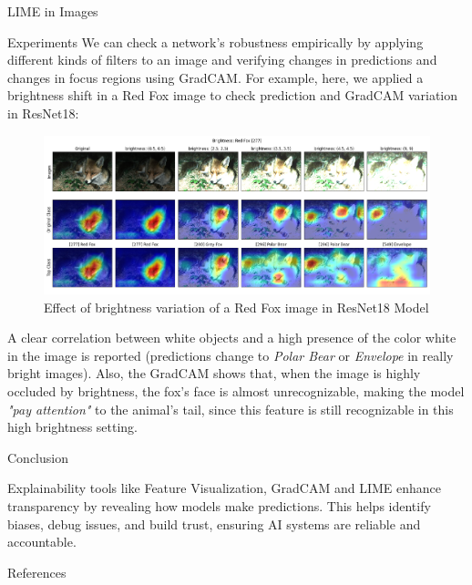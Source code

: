 \documentclass[final]{beamer}
\newlength{\colwidth}
\begin{document}
\begin{frame}[t]
\begin{columns}[t]
\begin{column}{\colwidth}
\begin{block}{LIME in Images}
  \end{block}

  \begin{block}{Experiments}
    We can check a network's robustness empirically by applying different kinds of filters 
    to an image and verifying changes in predictions and changes in focus regions using GradCAM.
    For example, here, we applied a brightness shift in a Red Fox image to check prediction and GradCAM variation in ResNet18:

    \begin{figure}
      \centering
      \includegraphics[width=0.96\linewidth]{images/fox-grad-cam-exp.png}
      \caption{Effect of brightness variation of a Red Fox image in ResNet18 Model}
    \end{figure}

    A clear correlation between white objects and a high presence of the color white in the image is reported 
    (predictions change to \textit{Polar Bear} or \textit{Envelope} in really bright images).
    Also, the GradCAM shows that, when the image is highly occluded by brightness, the fox's face is almost unrecognizable, 
    making the model \textit{"pay attention"} to the animal's tail, since this feature is still recognizable in this high brightness setting.
  \end{block}

  \begin{block}{Conclusion}

    Explainability tools like Feature Visualization, GradCAM and LIME enhance transparency by revealing how models make predictions. 
    This helps identify biases, debug issues, and build trust, ensuring AI systems are reliable and accountable.
  \end{block}

  \begin{block}{References}
    \nocite{*}
    

  \end{block}

\end{column}

\end{columns}
\end{frame}
\end{document}
